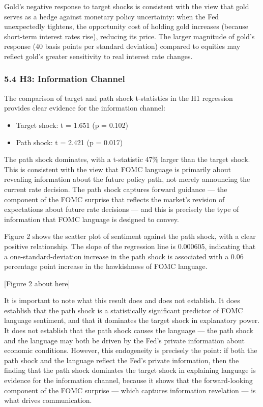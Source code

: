\documentclass[
]{article}
\providecommand{\tightlist}{%
  \setlength{\itemsep}{0pt}\setlength{\parskip}{0pt}}
\begin{document}
Gold's negative response to target shocks is consistent with the view
that gold serves as a hedge against monetary policy uncertainty: when
the Fed unexpectedly tightens, the opportunity cost of holding gold
increases (because short-term interest rates rise), reducing its price.
The larger magnitude of gold's response (40 basis points per standard
deviation) compared to equities may reflect gold's greater sensitivity
to real interest rate changes.

\subsubsection{5.4 H3: Information
Channel}\label{h3-information-channel}

The comparison of target and path shock t-statistics in the H1
regression provides clear evidence for the information channel:

\begin{itemize}
\tightlist
\item
  Target shock: \textbar t\textbar{} = 1.651 (p = 0.102)
\item
  Path shock: \textbar t\textbar{} = 2.421 (p = 0.017)
\end{itemize}

The path shock dominates, with a t-statistic 47\% larger than the target
shock. This is consistent with the view that FOMC language is primarily
about revealing information about the future policy path, not merely
announcing the current rate decision. The path shock captures forward
guidance --- the component of the FOMC surprise that reflects the
market's revision of expectations about future rate decisions --- and
this is precisely the type of information that FOMC language is designed
to convey.

Figure 2 shows the scatter plot of sentiment against the path shock,
with a clear positive relationship. The slope of the regression line is
0.000605, indicating that a one-standard-deviation increase in the path
shock is associated with a 0.06 percentage point increase in the
hawkishness of FOMC language.

{[}Figure 2 about here{]}

It is important to note what this result does and does not establish. It
does establish that the path shock is a statistically significant
predictor of FOMC language sentiment, and that it dominates the target
shock in explanatory power. It does not establish that the path shock
causes the language --- the path shock and the language may both be
driven by the Fed's private information about economic conditions.
However, this endogeneity is precisely the point: if both the path shock
and the language reflect the Fed's private information, then the finding
that the path shock dominates the target shock in explaining language is
evidence for the information channel, because it shows that the
forward-looking component of the FOMC surprise --- which captures
information revelation --- is what drives communication.
\end{document}

